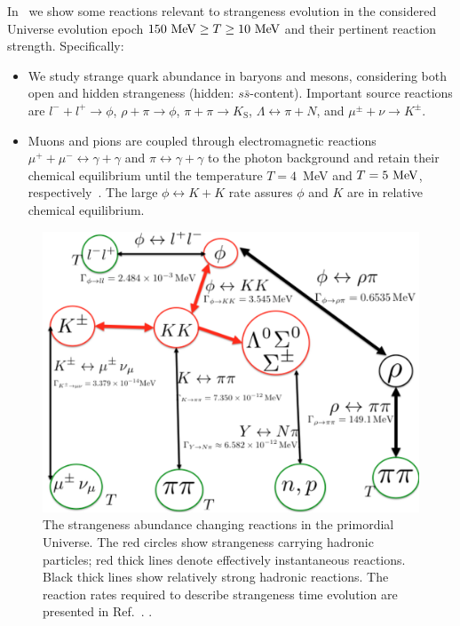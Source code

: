 In~ we show some reactions relevant to strangeness evolution in the considered Universe evolution epoch $150\text{ MeV}\ge T\ge 10\text{ MeV}$ and their pertinent reaction strength. Specifically:
\begin{itemize}
\item
We study strange quark abundance in baryons and mesons, considering both open and hidden strangeness (hidden: $s\bar s$-content). Important source reactions are $l^-+l^+\rightarrow\phi$, $\rho+\pi\rightarrow\phi$, $\pi+\pi\rightarrow K_\mathrm{S}$, $\Lambda \leftrightarrow \pi+ N$, and $\mu^\pm+\nu\rightarrow K^\pm$. 
\item
Muons and pions are coupled through electromagnetic reactions $\mu^++\mu^-\leftrightarrow\gamma+\gamma$ and $\pi\leftrightarrow\gamma+\gamma$ to the photon background and retain their chemical equilibrium until the temperature $T =4$\, MeV and $T=5\text{ MeV}$, respectively~\cite{Rafelski:2021aey,Kuznetsova:2008jt}. The large $\phi\leftrightarrow K+K$ rate assures $\phi$ and $K$ are in relative chemical equilibrium.
\end{itemize}

\begin{figure} 
\centerline{\includegraphics[width=0.9\linewidth]{./plots/Strangeness002_newJ.jpg}}
\caption{The strangeness abundance changing reactions in the primordial Universe. The red circles show strangeness carrying hadronic particles; red thick lines denote effectively instantaneous reactions. Black thick lines show relatively strong hadronic reactions. The reaction rates required to describe strangeness time evolution are presented in Ref.~\cite{Rafelski:2020ajx}. . }
\label{Strangeness_map2} 
\end{figure}

